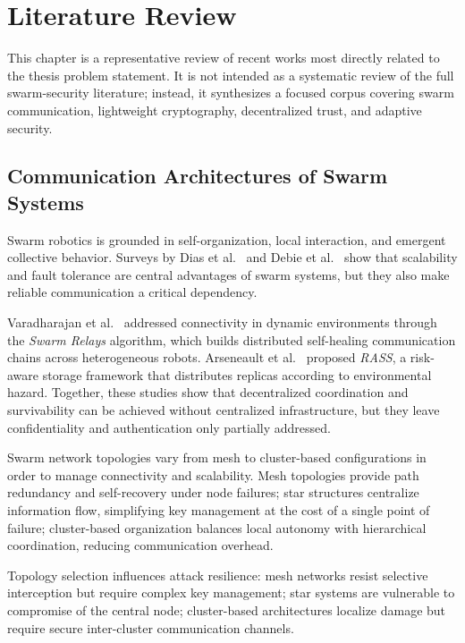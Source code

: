 \chapter{Literature Review}
\label{chap:lr}

This chapter is a representative review of recent works most directly related to the thesis problem statement. It is not intended as a systematic review of the full swarm-security literature; instead, it synthesizes a focused corpus covering swarm communication, lightweight cryptography, decentralized trust, and adaptive security.

\section{Communication Architectures of Swarm Systems}
\label{sec:swarm_comm_arch}

Swarm robotics is grounded in self-organization, local interaction, and emergent collective behavior. Surveys by Dias et al.~\cite{diasSwarmRoboticsPerspective2021} and Debie et al.~\cite{debieSwarmRoboticsSurvey2023} show that scalability and fault tolerance are central advantages of swarm systems, but they also make reliable communication a critical dependency.

Varadharajan et al.~\cite{varadharajanSwarmRelaysDistributed2020} addressed connectivity in dynamic environments through the \textit{Swarm Relays} algorithm, which builds distributed self-healing communication chains across heterogeneous robots. Arseneault et al.~\cite{arseneaultRASSRiskAwareSwarm2022} proposed \textit{RASS}, a risk-aware storage framework that distributes replicas according to environmental hazard. Together, these studies show that decentralized coordination and survivability can be achieved without centralized infrastructure, but they leave confidentiality and authentication only partially addressed.

Swarm network topologies vary from mesh to cluster-based configurations in order to manage connectivity and scalability. Mesh topologies provide path redundancy and self-recovery under node failures; star structures centralize information flow, simplifying key management at the cost of a single point of failure; cluster-based organization balances local autonomy with hierarchical coordination, reducing communication overhead.

Topology selection influences attack resilience: mesh networks resist selective interception but require complex key management; star systems are vulnerable to compromise of the central node; cluster-based architectures localize damage but require secure inter-cluster communication channels.

